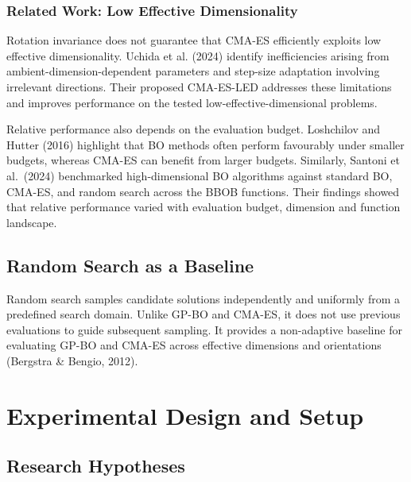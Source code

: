 \documentclass[11pt]{article}
\begin{document}
\subsubsection{Related Work: Low Effective Dimensionality}

Rotation invariance does not guarantee that CMA-ES efficiently exploits low effective dimensionality. Uchida et al. (2024) identify inefficiencies arising from ambient-dimension-dependent parameters and step-size adaptation involving irrelevant directions. Their proposed CMA-ES-LED addresses these limitations and improves performance on the tested low-effective-dimensional problems.

Relative performance also depends on the evaluation budget. Loshchilov and Hutter (2016) highlight that BO methods often perform favourably under smaller budgets, whereas CMA-ES can benefit from larger budgets. Similarly, Santoni et al.\ (2024) benchmarked high-dimensional BO algorithms against standard BO, CMA-ES, and random search across the BBOB functions. Their findings showed that relative performance varied with evaluation budget, dimension and function landscape.

\subsection{Random Search as a Baseline}

Random search samples candidate solutions independently and uniformly from a predefined search domain. Unlike GP-BO and CMA-ES, it does not use previous evaluations to guide subsequent sampling. It provides a non-adaptive baseline for evaluating GP-BO and CMA-ES across effective dimensions and orientations (Bergstra \& Bengio, 2012).

\section{Experimental Design and Setup}

\subsection{Research Hypotheses}
\end{document}
